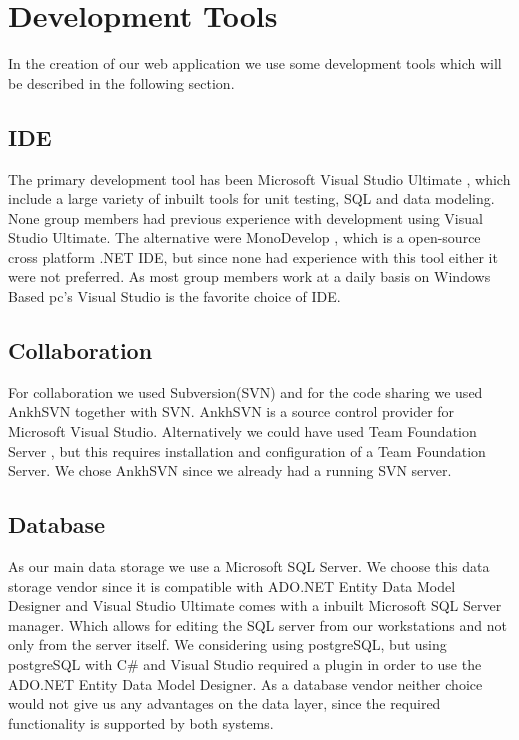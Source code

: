 \section{Development Tools}
In the creation of our web application we use some development tools which will be described in the following section. 

\subsection{IDE}
\label{sub:ide}
The primary development tool has been Microsoft Visual Studio Ultimate \cite{visualStudio}, which include a large variety of inbuilt tools for unit testing, SQL and data modeling. 
None group members had previous experience with development using Visual Studio Ultimate. The alternative were MonoDevelop \cite{mono}, which is a open-source cross platform .NET IDE, but since none had experience with this tool either it were not preferred. 
As most group members work at a daily basis on Windows Based pc's Visual Studio is the favorite choice of IDE. 



\subsection{Collaboration}
\label{sub:collaboration}
For collaboration we used Subversion(SVN) and for the code sharing we used AnkhSVN \cite{ankhsvn} together with SVN. 
AnkhSVN is a source control provider for Microsoft Visual Studio. 
Alternatively we could have used Team Foundation Server \cite{teamfoundation}, but this requires installation and configuration of a Team Foundation Server. 
We chose AnkhSVN since we already had a running SVN server. 

\subsection{Database}
\label{sub:database}
As our main data storage we use a Microsoft SQL Server. 
We choose this data storage vendor since it is compatible with ADO.NET Entity Data Model Designer and Visual Studio Ultimate comes with a inbuilt Microsoft SQL Server manager. 
Which allows for editing the SQL server from our workstations and not only from the server itself. 
We considering using postgreSQL, but using postgreSQL with C\# and Visual Studio required a plugin in order to use the ADO.NET Entity Data Model Designer. 
As a database vendor neither choice would not give us any advantages on the data layer, since the required functionality is supported by both systems. 